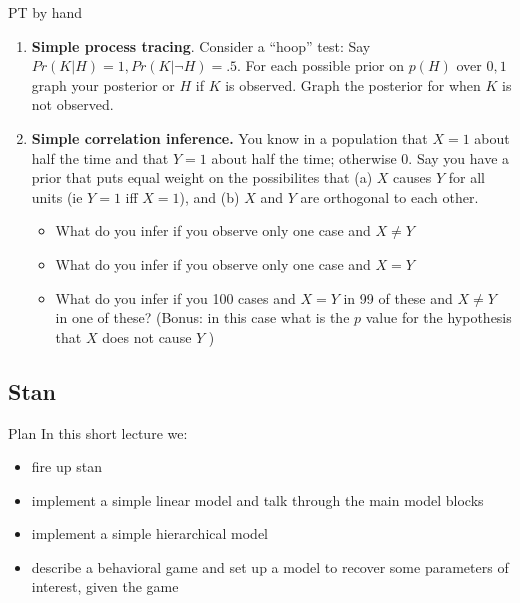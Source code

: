 \documentclass[
  11pt,
  ignorenonframetext,
]{beamer}
\providecommand{\tightlist}{%
  \setlength{\itemsep}{0pt}\setlength{\parskip}{0pt}}\usepackage{longtable,booktabs,array}
\begin{document}
\begin{frame}{PT by hand}
\protect\hypertarget{pt-by-hand}{}
\begin{enumerate}
\item
  \textbf{Simple process tracing}. Consider a ``hoop'' test: Say
  \(Pr(K|H) = 1, Pr(K|\neg H) = .5\). For each possible prior on
  \(p(H)\) over \(0,1\) graph your posterior or \(H\) if \(K\) is
  observed. Graph the posterior for when \(K\) is not observed.
\item
  \textbf{Simple correlation inference.} You know in a population that
  \(X=1\) about half the time and that \(Y=1\) about half the time;
  otherwise 0. Say you have a prior that puts equal weight on the
  possibilites that (a) \(X\) causes \(Y\) for all units (ie \(Y=1\) iff
  \(X=1\)), and (b) \(X\) and \(Y\) are orthogonal to each other.

  \begin{itemize}
  \tightlist
  \item
    What do you infer if you observe only one case and \(X \neq Y\)
  \item
    What do you infer if you observe only one case and \(X = Y\)
  \item
    What do you infer if you 100 cases and \(X = Y\) in 99 of these and
    \(X \neq Y\) in one of these? (Bonus: in this case what is the \(p\)
    value for the hypothesis that \(X\) does not cause \(Y\) )
  \end{itemize}
\end{enumerate}
\end{frame}

\hypertarget{stan}{%
\subsection{Stan}\label{stan}}

\begin{frame}{Plan}
\protect\hypertarget{plan}{}
In this short lecture we:

\begin{itemize}
\tightlist
\item
  fire up stan
\item
  implement a simple linear model and talk through the main model blocks
\item
  implement a simple hierarchical model
\item
  describe a behavioral game and set up a model to recover some
  parameters of interest, given the game
\end{itemize}
\end{frame}
\end{document}
